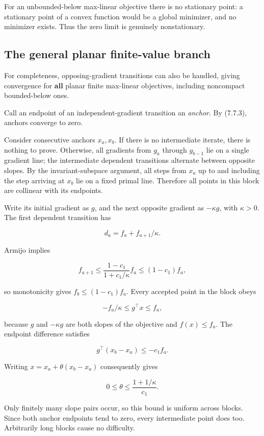 For an unbounded-below max-linear objective there is no stationary
point: a stationary point of a convex function would be a global
minimizer, and no minimizer exists. Thus the zero limit is genuinely
nonstationary.



\subsection{The general planar finite-value
branch}\label{H:the-general-planar-finite-value-branch}

For completeness, opposing-gradient transitions can also be handled,
giving convergence for \textbf{all} planar finite max-linear objectives,
including noncompact bounded-below ones.

Call an endpoint of an independent-gradient transition an \emph{anchor}.
By (7.7.3), anchors converge to zero.

Consider consecutive anchors \(x_a,x_b\). If there is no intermediate
iterate, there is nothing to prove. Otherwise, all gradients from
\(g_a\) through \(g_{b-1}\) lie on a single gradient line; the
intermediate dependent transitions alternate between opposite slopes. By
the invariant-subspace argument, all steps from \(x_a\) up to and
including the step arriving at \(x_b\) lie on a fixed primal line.
Therefore all points in this block are collinear with its endpoints.

Write its initial gradient as \(g\), and the next opposite gradient as
\(-\kappa g\), with \(\kappa>0\). The first dependent transition has

\[
d_a=f_a+f_{a+1}/\kappa.
\]

Armijo implies

\[
f_{a+1}\le\frac{1-c_1}{1+c_1/\kappa}f_a
\le(1-c_1)f_a,
\]

so monotonicity gives \(f_b\le(1-c_1)f_a\). Every accepted point in the
block obeys

\[
-f_a/\kappa\le g^\top x\le f_a,
\]

because \(g\) and \(-\kappa g\) are both slopes of the objective and
\(f(x)\le f_a\). The endpoint difference satisfies

\[
g^\top(x_b-x_a)\le-c_1 f_a.
\]

Writing \(x=x_a+\theta(x_b-x_a)\) consequently gives

\[
0\le\theta\le\frac{1+1/\kappa}{c_1}.
\]

Only finitely many slope pairs occur, so this bound is uniform across
blocks. Since both anchor endpoints tend to zero, every intermediate
point does too. Arbitrarily long blocks cause no difficulty.

